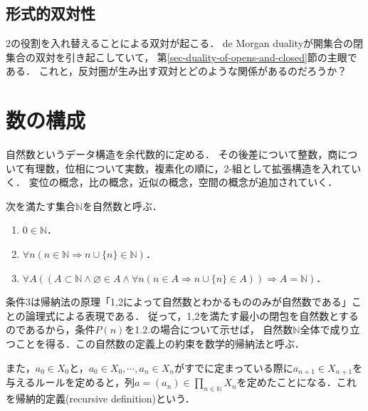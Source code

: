 \documentclass[uplatex,dvipdfmx]{jsreport}
\begin{document}
\subsection{形式的双対性}

$2$の役割を入れ替えることによる双対が起こる．
de Morgan dualityが開集合の閉集合の双対を引き起こしていて，
第\ref{sec-duality-of-opens-and-closed}節の主眼である．
これと，反対圏が生み出す双対とどのような関係があるのだろうか？

\section{数の構成}

\begin{screen}
    自然数というデータ構造を余代数的に定める．
    その後差について整数，商について有理数，位相について実数，複素化の順に，2-組として拡張構造を入れていく．
    変位の概念，比の概念，近似の概念，空間の概念が追加されていく．
\end{screen}

\begin{definition}
    次を満たす集合$\mathbb{N}$を自然数と呼ぶ．
    \begin{enumerate}
        \item $0\in\mathbb{N}$．
        \item $\forall n(n\in\mathbb{N}\Rightarrow n\cup\{ n\}\in\mathbb{N})$．
        \item $\forall A((A\subset\mathbb{N}\wedge\varnothing\in A\wedge\forall n(n\in A\Rightarrow n\cup\{n\}\in A))\Rightarrow A=\mathbb{N})$．
    \end{enumerate}
\end{definition}
\begin{remark}
    条件3は帰納法の原理「1,2によって自然数とわかるもののみが自然数である」ことの論理式による表現である．
    従って，1,2を満たす最小の閉包を自然数とするのであるから，条件$P(n)$を1.2.の場合について示せば，
    自然数$\mathbb{N}$全体で成り立つことを得る．この自然数の定義上の約束を数学的帰納法と呼ぶ．

    また，$a_0\in X_0$と，$a_0\in X_0,\cdots,a_n\in X_n$がすでに定まっている際に$a_{n+1}\in X_{n+1}$を与えるルールを定めると，列$a=(a_n)\in\prod_{n\in\mathbb{N}}X_n$を定めたことになる．これを帰納的定義(recursive definition)という．
\end{remark}
\end{document}
